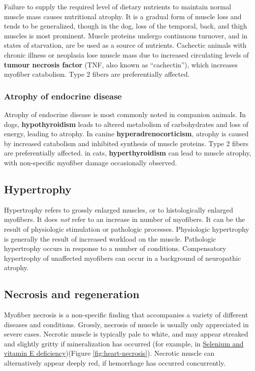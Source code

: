 \documentclass[openany]{book}
\begin{document}
Failure to supply the required level of dietary nutrients to maintain
normal muscle mass causes nutritional atrophy. It is a gradual form of
muscle loss and tends to be generalized, though in the dog, loss of the
temporal, back, and thigh muscles is most prominent. Muscle proteins
undergo continuous turnover, and in states of starvation, are be used as
a source of nutrients. Cachectic animals with chronic illness or
neoplasia lose muscle mass due to increased circulating levels of
\textbf{tumour necrosis factor} (TNF, also known as ``cachectin''),
which increases myofiber catabolism. Type 2 fibers are preferentially
affected.

\subsubsection{Atrophy of endocrine
disease}\label{atrophy-of-endocrine-disease}

Atrophy of endocrine disease is most commonly noted in companion
animals. In dogs, \textbf{hypothyroidism} leads to altered metabolism of
carbohydrates and loss of energy, leading to atrophy. In canine
\textbf{hyperadrenocorticism}, atrophy is caused by increased catabolism
and inhibited synthesis of muscle proteins. Type 2 fibers are
preferentially affected. in cats, \textbf{hyperthyroidism} can lead to
muscle atrophy, with non-specific myofiber damage occasionally observed.

\subsection{Hypertrophy}\label{hypertrophy}

Hypertrophy refers to grossly enlarged muscles, or to histologically
enlarged myofibers. It does \emph{not} refer to an increase in number of
myofibers. It can be the result of physiologic stimulation or pathologic
processes. Physiologic hypertrophy is generally the result of increased
workload on the muscle. Pathologic hypertrophy occurs in response to a
number of conditions. Compensatory hypertrophy of unaffected myofibers
can occur in a background of neuropathic atrophy.

\hypertarget{necrosis-and-regeneration}{\subsection{Necrosis and
regeneration}\label{necrosis-and-regeneration}}

Myofiber necrosis is a non-specific finding that accompanies a variety
of different diseases and conditions. Grossly, necrosis of muscle is
usually only appreciated in severe cases. Necrotic muscle is typically
pale to white, and may appear streaked and slightly gritty if
mineralization has occurred (for example, in
\protect\hyperlink{selenium-and-vitamin-e-deficiency}{Selenium and
vitamin E deficiency})(Figure \ref{fig:heart-necrosis}). Necrotic muscle
can alternatively appear deeply red, if hemorrhage has occurred
concurrently.
\end{document}
